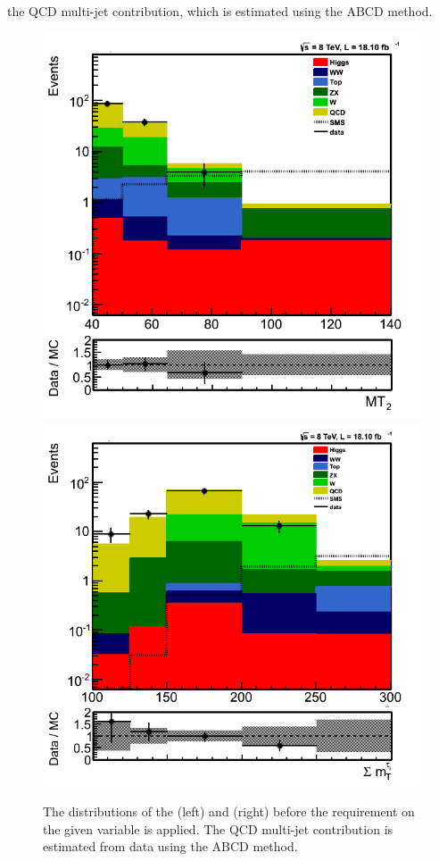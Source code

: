 the QCD multi-jet contribution, which is estimated using the ABCD method.
\begin{figure}[iHhtb]
\centering
\includegraphics[angle=0,scale=0.35]{QCDbginTauTau/Bin1_QCDestimation.png}
\includegraphics[angle=0,scale=0.35]{QCDbginTauTau/Bin2_QCDestimation.png}

\caption{The distributions of the \mttwo (left) and \SumMT (right) before the requirement on the given variable
is applied. The QCD multi-jet contribution is estimated from data using the ABCD method.}
\label{fig:5QCDbg}
\end{figure}


